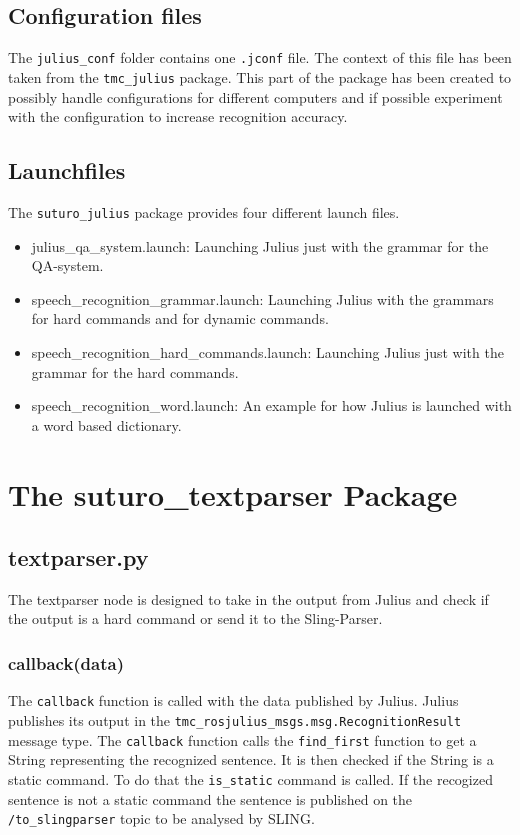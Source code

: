 \documentclass[main.tex]{subfiles}
\begin{document}
    \subsection{Configuration files}
        The \texttt{julius\_conf} folder contains one \texttt{.jconf} file. The context of this file has been taken from the \texttt{tmc\_julius} package. This part of the package has been created to possibly handle configurations for different computers and if possible experiment with the configuration to increase recognition accuracy.
    \subsection{Launchfiles}
        The \texttt{suturo\_julius} package provides four different launch files.\\
        \begin{itemize}
            \item julius\_qa\_system.launch:
            \subitem Launching Julius just with the grammar for the QA-system.
            \item speech\_recognition\_grammar.launch:
            \subitem Launching Julius with the grammars for hard commands and for dynamic commands.
            \item speech\_recognition\_hard\_commands.launch:
            \subitem Launching Julius just with the grammar for the hard commands.
            \item speech\_recognition\_word.launch:
            \subitem An example for how Julius is launched with a word based dictionary.
        \end{itemize}

\section{The suturo\_textparser Package}
    \subsection{textparser.py}
        The textparser node is designed to take in the output from Julius and check if the output is a hard command or send it to the Sling-Parser.
        \subsubsection{callback(data)}
            The \texttt{callback} function is called with the data published by Julius. Julius publishes its output in the \texttt{tmc\_rosjulius\_msgs.msg.RecognitionResult} message type. The \texttt{callback} function calls the \texttt{find\_first} function to get a String representing the recognized sentence. It is then checked if the String is a static command. To do that the \texttt{is\_static} command is called. If the recogized sentence is not a static command the sentence is published on the \texttt{/to\_slingparser} topic to be analysed by SLING.
    
\end{document}
